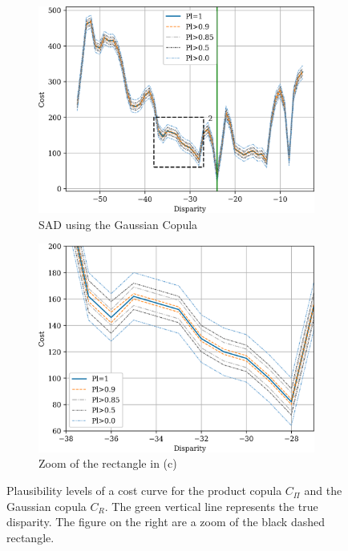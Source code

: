 \begin{figure}
    \begin{subfigure}{0.48\linewidth}
        \centering
        \includegraphics[width=\linewidth]{Images/bel_100_120.png}
        \caption{SAD using the Gaussian Copula}
        \label{fig:belief_gaussian}
    \end{subfigure}\hfill
    \begin{subfigure}{0.48\linewidth}
        \centering
        \includegraphics[width=\linewidth]{Images/bel_100_120_zoom.png}
        \caption{Zoom of the rectangle in (c)}
        \label{fig:belief_gaussian_zoom}
    \end{subfigure}
    \caption{Plausibility levels of a cost curve for the product copula $C_\Pi$ and the Gaussian copula $C_R$. The green vertical line represents the true disparity. The figure on the right are a zoom of the black dashed rectangle.}
    \label{fig:belief_curves}
\end{figure}

